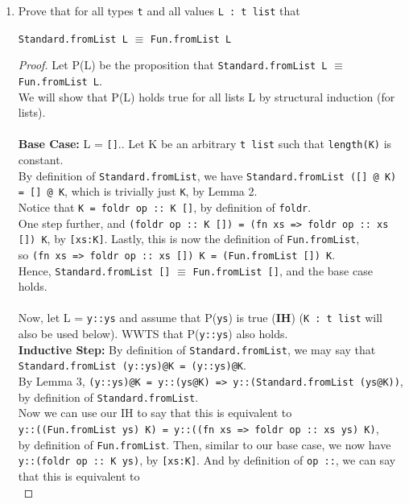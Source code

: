 \documentclass[11pt]{article}
\begin{document}
\begin{enumerate}
\item Prove that for all types \verb|t| and all values \verb|L : t list| that 
\begin{center}\verb|Standard.fromList L| $\equiv$ \verb|Fun.fromList L|\end{center}
\begin{proof}
Let P(L) be the proposition that \verb|Standard.fromList L| $\equiv$ \verb|Fun.fromList L|.\\
We will show that P(L) holds true for all lists L by structural induction (for lists).\\\\
\textbf{Base Case:} L = \verb|[]|.. Let K be an arbitrary \verb|t list| such that  \verb|length(K)| is constant.\\
By definition of \verb|Standard.fromList|, we have \verb|Standard.fromList ([] @ K) = [] @ K|, which is trivially just \verb|K|, by Lemma 2.\\
Notice that \verb|K = foldr op :: K []|, by definition of \verb|foldr|.\\
One step further, and \verb|(foldr op :: K []) = (fn xs => foldr op :: xs []) K|, by \verb|[xs:K]|.  Lastly, this is now the definition of \verb|Fun.fromList|,\\
so \verb|(fn xs => foldr op :: xs []) K = (Fun.fromList []) K|.\\
Hence, \verb|Standard.fromList []| $\equiv$ \verb|Fun.fromList []|, and the base case holds.\\\\
Now, let L = \verb|y::ys| and assume that P(\verb|ys|) is true (\textbf{IH}) (\verb|K : t list| will also be used below).  WWTS that P(\verb|y::ys|) also holds.\\
\textbf{Inductive Step:}  By definition of \verb|Standard.fromList|, we may say that\\
\verb|Standard.fromList (y::ys)@K = (y::ys)@K|.\\
By Lemma 3, \verb|(y::ys)@K = y::(ys@K) => y::(Standard.fromList (ys@K))|, by definition of \verb|Standard.fromList|.\\
Now we can use our IH to say that this is equivalent to\\
\verb|y::((Fun.fromList ys) K) = y::((fn xs => foldr op :: xs ys) K)|,\\
by definition of \verb|Fun.fromList|.  Then, similar to our base case, we now have \verb|y::(foldr op :: K ys)|, by \verb|[xs:K]|. And by definition of \verb|op ::|, we can say that this is equivalent to\\

\end{proof}
\end{enumerate}
\end{document}
